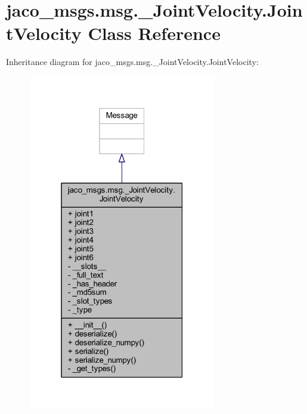 \hypertarget{classjaco__msgs_1_1msg_1_1__JointVelocity_1_1JointVelocity}{}\section{jaco\+\_\+msgs.\+msg.\+\_\+\+Joint\+Velocity.\+Joint\+Velocity Class Reference}
\label{classjaco__msgs_1_1msg_1_1__JointVelocity_1_1JointVelocity}


Inheritance diagram for jaco\+\_\+msgs.\+msg.\+\_\+\+Joint\+Velocity.\+Joint\+Velocity\+:
\nopagebreak
\begin{figure}[H]
\begin{center}
\leavevmode
\includegraphics[width=232pt]{d0/d0a/classjaco__msgs_1_1msg_1_1__JointVelocity_1_1JointVelocity__inherit__graph}
\end{center}
\end{figure}


